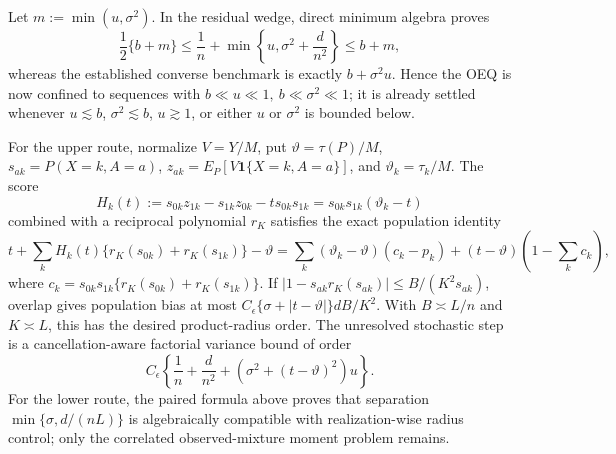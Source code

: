 Let \(m:=\min(u,\sigma^2)\).  In the residual wedge, direct minimum algebra proves
\[
 \frac12\{b+m\}\le
 \frac1n+\min\left\{u,\sigma^2+\frac d{n^2}\right\}
 \le b+m,
\]
whereas the established converse benchmark is exactly \(b+\sigma^2u\).  Hence the OEQ is now confined to sequences with \(b\ll u\ll1,\ b\ll\sigma^2\ll1\); it is already settled whenever \(u\lesssim b\), \(\sigma^2\lesssim b\), \(u\gtrsim1\), or either \(u\) or \(\sigma^2\) is bounded below.

For the upper route, normalize \(V=Y/M\), put \(\vartheta=\tau(P)/M\), \(s_{ak}=P(X=k,A=a)\), \(z_{ak}=E_P[V\mathbf 1\{X=k,A=a\}]\), and \(\vartheta_k=\tau_k/M\).  The score
\[
 H_k(t):=s_{0k}z_{1k}-s_{1k}z_{0k}-t s_{0k}s_{1k}
 =s_{0k}s_{1k}(\vartheta_k-t)
\]
combined with a reciprocal polynomial \(r_K\) satisfies the exact population identity
\[
 t+\sum_kH_k(t)\{r_K(s_{0k})+r_K(s_{1k})\}-\vartheta
 =\sum_k(\vartheta_k-\vartheta)(c_k-p_k)
 +(t-\vartheta)\left(1-\sum_kc_k\right),
\]
where \(c_k=s_{0k}s_{1k}\{r_K(s_{0k})+r_K(s_{1k})\}\).  If \(|1-s_{ak}r_K(s_{ak})|\le B/(K^2s_{ak})\), overlap gives population bias at most \(C_{\epsilon}\{\sigma+|t-\vartheta|\}dB/K^2\).  With \(B\asymp L/n\) and \(K\asymp L\), this has the desired product-radius order.  The unresolved stochastic step is a cancellation-aware factorial variance bound of order
\[
 C_{\epsilon}\left\{\frac1n+\frac d{n^2}+
 (\sigma^2+(t-\vartheta)^2)u\right\}.
\]
For the lower route, the paired formula above proves that separation \(\min\{\sigma,d/(nL)\}\) is algebraically compatible with realization-wise radius control; only the correlated observed-mixture moment problem remains.